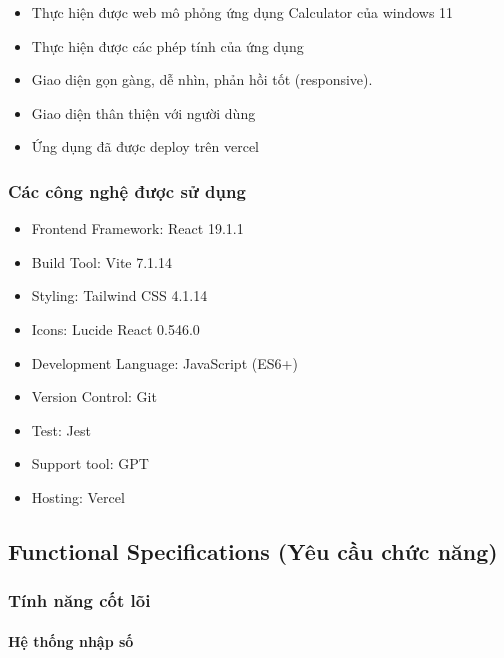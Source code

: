 \begin{itemize}
    \item Thực hiện được web mô phỏng ứng dụng Calculator của windows 11
    \item Thực hiện được các phép tính của ứng dụng
    \item Giao diện gọn gàng, dễ nhìn, phản hồi tốt (responsive).
    \item Giao diện thân thiện với người dùng
    \item Ứng dụng đã được deploy trên vercel
\end{itemize}

\subsubsection{Các công nghệ được sử dụng}

\begin{itemize}
    \item Frontend Framework: React 19.1.1
    \item Build Tool: Vite 7.1.14
    \item Styling: Tailwind CSS 4.1.14
    \item Icons: Lucide React 0.546.0
    \item Development Language: JavaScript (ES6+)
    \item Version Control: Git
    \item Test: Jest
    \item Support tool: GPT
    \item Hosting: Vercel
\end{itemize}

\subsection{Functional Specifications (Yêu cầu chức năng)}

\subsubsection{Tính năng cốt lõi}

\paragraph{Hệ thống nhập số}

